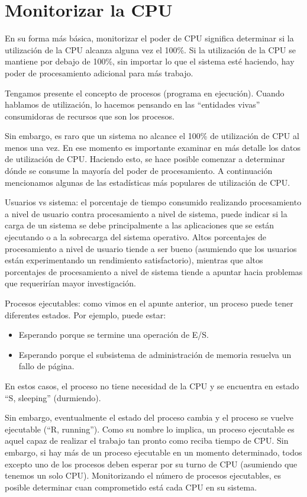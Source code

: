 \documentclass[12pt]{article}
\begin{document}
\section*{Monitorizar la CPU}
En su forma más básica, monitorizar el poder de CPU significa determinar si
 la utilización de la CPU alcanza alguna vez el 100\%. Si la utilización 
de la CPU se mantiene por debajo de 100\%, sin importar lo que el sistema 
esté haciendo, hay poder de procesamiento adicional para más trabajo.

Tengamos presente el concepto de procesos (programa en ejecución). Cuando 
hablamos de utilización, lo hacemos pensando en las ``entidades vivas'' 
consumidoras de recursos que son los procesos. 

Sin embargo, es raro que un sistema no alcance el 100\% de utilización de 
CPU al menos una vez. En ese momento es importante examinar en más detalle 
los datos de utilización de CPU. Haciendo esto, se hace posible comenzar a 
determinar dónde se consume la mayoría del poder de procesamiento. A 
continuación mencionamos algunas de las estadísticas más populares de 
utilización de CPU.

Usuarios vs sistema: el porcentaje de tiempo consumido realizando 
procesamiento a nivel de usuario contra procesamiento a nivel de sistema, 
puede indicar si la carga de un sistema se debe principalmente a las 
aplicaciones que se están ejecutando o a la sobrecarga del sistema 
operativo. Altos porcentajes de procesamiento a nivel de usuario tiende a 
ser bueno (asumiendo que los usuarios están experimentando un rendimiento
satisfactorio), mientras que altos porcentajes de procesamiento a nivel de 
sistema tiende a apuntar hacia problemas que requerirían mayor 
investigación.

Procesos ejecutables: como vimos en el apunte anterior, un proceso puede 
tener diferentes estados. Por ejemplo, puede estar:
\begin{itemize}
\item Esperando porque se termine una operación de E/S.
\item Esperando porque el subsistema de administración de memoria 
resuelva un fallo de página.
\end{itemize}
En estos casos, el proceso no tiene necesidad de la CPU y se encuentra en
estado ``S, sleeping'' (durmiendo).  

Sin embargo, eventualmente el estado del proceso cambia y el proceso se 
vuelve ejecutable (``R, running''). Como su nombre lo implica, un proceso 
ejecutable es aquel capaz de realizar el trabajo tan pronto como reciba 
tiempo de CPU. Sin embargo, si hay más de un proceso ejecutable en un 
momento determinado, todos excepto uno de los procesos deben esperar por su 
turno de CPU (asumiendo que tenemos un solo CPU). Monitorizando el
número de procesos ejecutables, es posible determinar cuan comprometido 
está cada CPU en su sistema.
\end{document}
